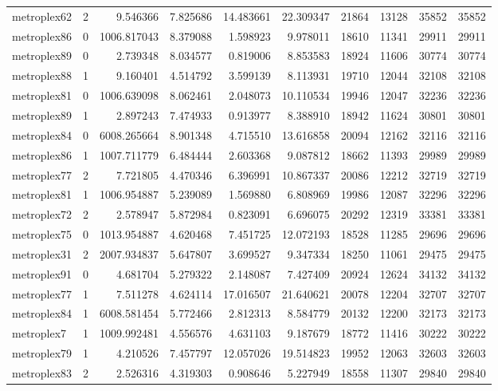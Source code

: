 \begin{longtable}{|l|r|r|r|r|r|r|r|r|r|}
metroplex62 & 2 & 9.546366 & 7.825686 & 14.483661 & 22.309347 & 21864 & 13128 & 35852 & 35852 \\
metroplex86 & 0 & 1006.817043 & 8.379088 & 1.598923 & 9.978011 & 18610 & 11341 & 29911 & 29911 \\
metroplex89 & 0 & 2.739348 & 8.034577 & 0.819006 & 8.853583 & 18924 & 11606 & 30774 & 30774 \\
metroplex88 & 1 & 9.160401 & 4.514792 & 3.599139 & 8.113931 & 19710 & 12044 & 32108 & 32108 \\
metroplex81 & 0 & 1006.639098 & 8.062461 & 2.048073 & 10.110534 & 19946 & 12047 & 32236 & 32236 \\
metroplex89 & 1 & 2.897243 & 7.474933 & 0.913977 & 8.388910 & 18942 & 11624 & 30801 & 30801 \\
metroplex84 & 0 & 6008.265664 & 8.901348 & 4.715510 & 13.616858 & 20094 & 12162 & 32116 & 32116 \\
metroplex86 & 1 & 1007.711779 & 6.484444 & 2.603368 & 9.087812 & 18662 & 11393 & 29989 & 29989 \\
metroplex77 & 2 & 7.721805 & 4.470346 & 6.396991 & 10.867337 & 20086 & 12212 & 32719 & 32719 \\
metroplex81 & 1 & 1006.954887 & 5.239089 & 1.569880 & 6.808969 & 19986 & 12087 & 32296 & 32296 \\
metroplex72 & 2 & 2.578947 & 5.872984 & 0.823091 & 6.696075 & 20292 & 12319 & 33381 & 33381 \\
metroplex75 & 0 & 1013.954887 & 4.620468 & 7.451725 & 12.072193 & 18528 & 11285 & 29696 & 29696 \\
metroplex31 & 2 & 2007.934837 & 5.647807 & 3.699527 & 9.347334 & 18250 & 11061 & 29475 & 29475 \\
metroplex91 & 0 & 4.681704 & 5.279322 & 2.148087 & 7.427409 & 20924 & 12624 & 34132 & 34132 \\
metroplex77 & 1 & 7.511278 & 4.624114 & 17.016507 & 21.640621 & 20078 & 12204 & 32707 & 32707 \\
metroplex84 & 1 & 6008.581454 & 5.772466 & 2.812313 & 8.584779 & 20132 & 12200 & 32173 & 32173 \\
metroplex7 & 1 & 1009.992481 & 4.556576 & 4.631103 & 9.187679 & 18772 & 11416 & 30222 & 30222 \\
metroplex79 & 1 & 4.210526 & 7.457797 & 12.057026 & 19.514823 & 19952 & 12063 & 32603 & 32603 \\
metroplex83 & 2 & 2.526316 & 4.319303 & 0.908646 & 5.227949 & 18558 & 11307 & 29840 & 29840 \\

\end{longtable}
